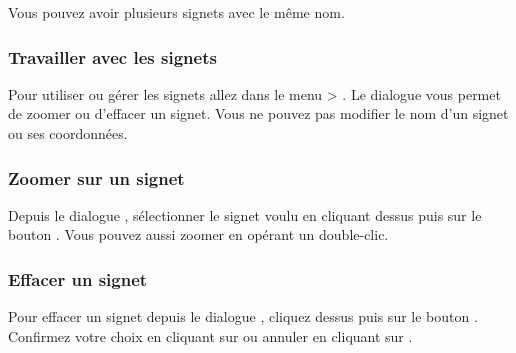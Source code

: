 Vous pouvez avoir plusieurs signets avec le m\^eme nom.

%

\subsubsection{Travailler avec les signets}
Pour utiliser ou g\'erer les signets allez dans le menu  > .
Le dialogue  vous permet de zoomer ou d'effacer un signet.
Vous ne pouvez pas modifier le nom d'un signet ou ses coordonn\'ees.

\subsubsection{Zoomer sur un signet}
Depuis le dialogue , s\'electionner le signet voulu en cliquant dessus puis sur le bouton . Vous pouvez aussi zoomer en op\'erant un double-clic.


\subsubsection{Effacer un signet}
Pour effacer un signet depuis le dialogue , cliquez dessus puis sur le bouton .
Confirmez votre choix en cliquant sur  ou annuler en cliquant sur .

